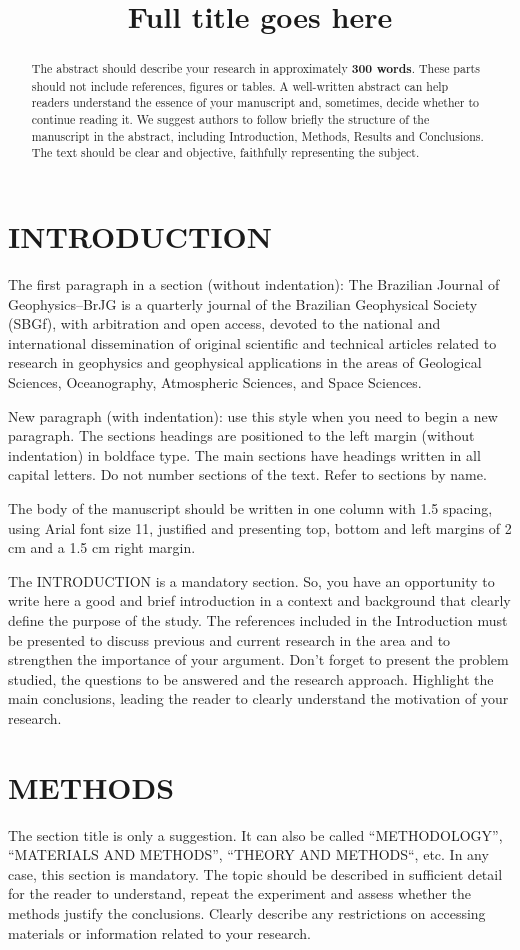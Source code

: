 \documentclass{BrJG_submit}
\title{Full title goes here}
\begin{document}
\begin{abstract}
The abstract should describe your research in approximately {\bf 300 words}. These parts should not include references, figures or tables. A well-written abstract can help readers understand the essence of your manuscript and, sometimes, decide whether to continue reading it. We suggest authors to follow briefly the structure of the manuscript in the abstract, including Introduction, Methods, Results and Conclusions. The text should be clear and objective, faithfully representing the subject.
\end{abstract}


\section*{INTRODUCTION}

The first paragraph in a section (without indentation): The Brazilian Journal of Geophysics–BrJG is a quarterly journal of the Brazilian Geophysical Society (SBGf), with arbitration and open access, devoted to the national and international dissemination of original scientific and technical articles related to research in geophysics and geophysical applications in the areas of Geological Sciences, Oceanography, Atmospheric Sciences, and Space Sciences.

New paragraph (with indentation): use this style when you need to begin a new paragraph.
The sections headings are positioned to the left margin (without indentation) in boldface type. The main sections have headings written in all capital letters. Do not number sections of the text. Refer to sections by name.

The body of the manuscript should be written in one column with 1.5 spacing, using Arial font size 11, justified and presenting top, bottom and left margins of 2 cm and a 1.5 cm right margin.

The INTRODUCTION is a mandatory section. So, you have an opportunity to write here a good and brief introduction in a context and background that clearly define the purpose of the study. The references included in the Introduction must be presented to discuss previous and current research in the area and to strengthen the importance of your argument. Don’t forget to present the problem studied, the questions to be answered and the research approach. Highlight the main conclusions, leading the reader to clearly understand the motivation of your research.

\section*{METHODS}
The section title is only a suggestion. It can also be called ``METHODOLOGY'', ``MATERIALS AND METHODS'', ``THEORY AND METHODS``, etc. In any case, this section is mandatory. The topic should be described in sufficient detail for the reader to understand, repeat the experiment and assess whether the methods justify the conclusions. Clearly describe any restrictions on accessing materials or information related to your research.
\end{document}
